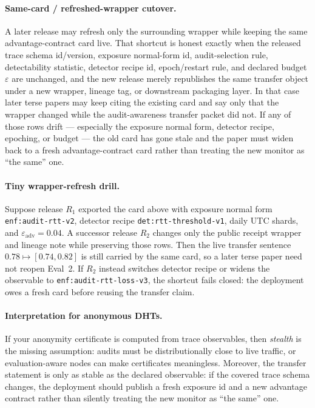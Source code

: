 \documentclass[11pt]{article}
\begin{document}
\paragraph{Same-card / refreshed-wrapper cutover.}
A later release may refresh only the surrounding wrapper while keeping the same advantage-contract card live.
That shortcut is honest exactly when the released trace schema id/version, exposure normal-form id, audit-selection rule, detectability statistic, detector recipe id, epoch/restart rule, and declared budget $\varepsilon$ are unchanged, and the new release merely republishes the same transfer object under a new wrapper, lineage tag, or downstream packaging layer.
In that case later terse papers may keep citing the existing card and say only that the wrapper changed while the audit-awareness transfer packet did not.
If any of those rows drift --- especially the exposure normal form, detector recipe, epoching, or budget --- the old card has gone stale and the paper must widen back to a fresh advantage-contract card rather than treating the new monitor as ``the same'' one.

\paragraph{Tiny wrapper-refresh drill.}
Suppose release $R_1$ exported the card above with exposure normal form \texttt{enf:audit-rtt-v2}, detector recipe \texttt{det:rtt-threshold-v1}, daily UTC shards, and $\varepsilon_{\mathrm{adv}}=0.04$.
A successor release $R_2$ changes only the public receipt wrapper and lineage note while preserving those rows.
Then the live transfer sentence $0.78 \mapsto [0.74,0.82]$ is still carried by the same card, so a later terse paper need not reopen Eval~2.
If $R_2$ instead switches detector recipe or widens the observable to \texttt{enf:audit-rtt-loss-v3}, the shortcut fails closed: the deployment owes a fresh card before reusing the transfer claim.

\paragraph{Interpretation for anonymous DHTs.}
If your anonymity certificate is computed from trace observables, then \emph{stealth} is the missing assumption:
audits must be distributionally close to live traffic, or evaluation-aware nodes can make certificates meaningless.
Moreover, the transfer statement is only as stable as the declared observable: if the covered trace schema changes, the deployment should publish a fresh exposure id and a new advantage contract rather than silently treating the new monitor as ``the same'' one.
\end{document}

